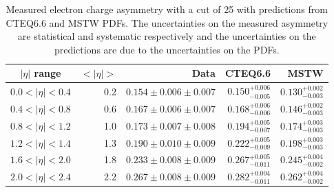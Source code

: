 \begin{table}[htbp]
\begin{center}
\begin{tabular}{crrrr}
    \toprule
$|\eta|$ range & $<|\eta|>$ & Data & CTEQ6.6 & MSTW \\
\midrule 
$0.0<|\eta|<0.4$ & 0.2 & $0.154\pm0.006\pm0.007$ & $0.150^{+0.006}_{-0.005}$ & $0.130^{+0.002}_{-0.003}$\\
$0.4<|\eta|<0.8$ & 0.6 & $0.167\pm0.006\pm0.007$ & $0.168^{+0.006}_{-0.006}$ & $0.146^{+0.002}_{-0.003}$\\
$0.8<|\eta|<1.2$ & 1.0 & $0.173\pm0.007\pm0.008$ & $0.194^{+0.005}_{-0.007}$ & $0.174^{+0.003}_{-0.003}$\\
$1.2<|\eta|<1.4$ & 1.3 & $0.190\pm0.010\pm0.009$ & $0.222^{+0.005}_{-0.009}$ & $0.198^{+0.003}_{-0.003}$\\
$1.6<|\eta|<2.0$ & 1.8 & $0.233\pm0.008\pm0.009$ & $0.267^{+0.005}_{-0.011}$ & $0.245^{+0.004}_{-0.002}$\\
$2.0<|\eta|<2.4$ & 2.2 & $0.267\pm0.008\pm0.009$ & $0.282^{+0.004}_{-0.011}$ & $0.262^{+0.004}_{-0.002}$\\
    \bottomrule
\end{tabular}
\caption[Measured electron charge asymmetry with a \pT cut of {\unit{25}{\GeV}}]
{Measured electron charge asymmetry with a \pT cut of \unit{25}{\GeV} with
predictions from CTEQ6.6 and MSTW PDFs.  The uncertainties on the measured
asymmetry are statistical and systematic respectively and the uncertainties on
the predictions are due to the uncertainties on the PDFs\cite{baisini2010electron}.}
\label{tab:results25}
\end{center}
\end{table}


